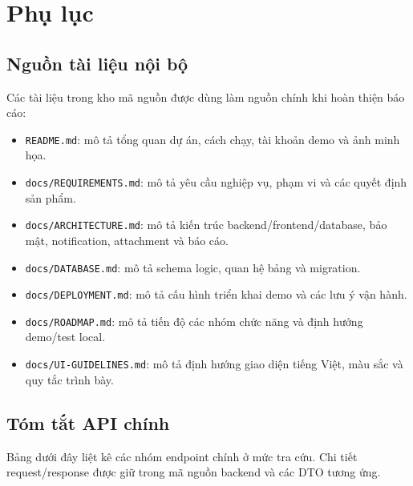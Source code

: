 \chapter{Phụ lục}

\section{Nguồn tài liệu nội bộ}
Các tài liệu trong kho mã nguồn được dùng làm nguồn chính khi hoàn thiện báo cáo:

\begin{itemize}
  \item \texttt{README.md}: mô tả tổng quan dự án, cách chạy, tài khoản demo và ảnh minh họa.
  \item \texttt{docs/REQUIREMENTS.md}: mô tả yêu cầu nghiệp vụ, phạm vi và các quyết định sản phẩm.
  \item \texttt{docs/ARCHITECTURE.md}: mô tả kiến trúc backend/frontend/database, bảo mật, notification, attachment và báo cáo.
  \item \texttt{docs/DATABASE.md}: mô tả schema logic, quan hệ bảng và migration.
  \item \texttt{docs/DEPLOYMENT.md}: mô tả cấu hình triển khai demo và các lưu ý vận hành.
  \item \texttt{docs/ROADMAP.md}: mô tả tiến độ các nhóm chức năng và định hướng demo/test local.
  \item \texttt{docs/UI-GUIDELINES.md}: mô tả định hướng giao diện tiếng Việt, màu sắc và quy tắc trình bày.
\end{itemize}

\section{Tóm tắt API chính}
Bảng dưới đây liệt kê các nhóm endpoint chính ở mức tra cứu. Chi tiết request/response được giữ trong mã nguồn backend và các DTO tương ứng.

